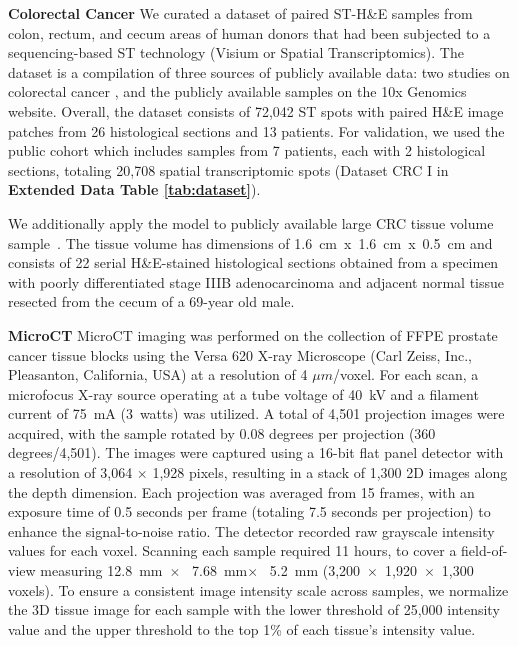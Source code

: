 \noindent\textbf{Colorectal Cancer} We curated a dataset of paired ST-H\&E samples from colon, rectum, and cecum areas of human donors that had been subjected to a sequencing-based ST technology (Visium or Spatial Transcriptomics). The dataset is a compilation of three sources of publicly available data:  two studies on colorectal cancer \cite{valdeolivas2024profiling,mirzazadeh2023spatially}, and the publicly available samples on the 10x Genomics website. Overall, the dataset consists of 72,042 ST spots with paired H\&E image patches from 26 histological sections and 13 patients. 
For validation, we used the public cohort \cite{valdeolivas2024profiling} which includes 
samples from 7 patients, each with 2 histological sections, totaling 20,708 spatial transcriptomic spots (Dataset CRC I in \textbf{Extended Data Table \ref{tab:dataset}}). 

We additionally apply the model to publicly available large CRC tissue volume sample~\cite{lin2023multiplexed}. The tissue volume has dimensions of 1.6~cm~x~1.6~cm~x~0.5~cm and consists of 22 serial H\&E-stained histological sections obtained from a specimen with poorly differentiated stage IIIB adenocarcinoma and adjacent normal tissue resected from the cecum of a 69-year old male. 




\noindent\textbf{MicroCT} MicroCT imaging was performed on the collection of FFPE prostate cancer tissue blocks using the Versa 620 X-ray Microscope (Carl Zeiss, Inc., Pleasanton, California, USA) at a resolution of 4 $\mu m$/voxel. For each scan, a microfocus X-ray source operating at a tube voltage of 40~kV and a filament current of 75~mA (3~watts) was utilized. A total of 4,501 projection images were acquired, with the sample rotated by 0.08 degrees per projection (360 degrees/4,501). The images were captured using a 16-bit flat panel detector with a resolution of 3,064 $\times$ 1,928 pixels, resulting in a stack of 1,300 2D images along the depth dimension. Each projection was averaged from 15 frames, with an exposure time of 0.5 seconds per frame (totaling 7.5 seconds per projection) to enhance the signal-to-noise ratio. The detector recorded raw grayscale intensity values for each voxel. Scanning each sample required 11 hours, to cover a field-of-view measuring 12.8~mm~$\times$~ 7.68~mm$\times$~ 5.2~mm (3,200~$\times$~1,920~$\times$~1,300 voxels). 
To ensure a consistent image intensity scale across samples, we normalize the 3D tissue image for each sample with the lower threshold of 25,000 intensity value and the upper threshold to the top 1\% of each tissue’s intensity value.


